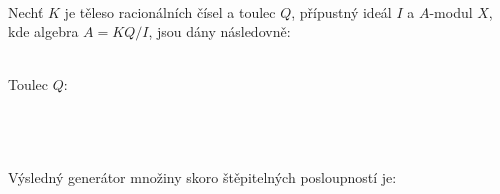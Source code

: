         \paragraph{ } Nechť $K$ je těleso racionálních čísel a toulec $Q$, přípustný ideál $I$ a $A$-modul $X$, 
        kde algebra $A=KQ/I$, jsou dány následovně: \\\\
        \centerline{
          Toulec $Q$: 
         }\\\\\\
         Výsledný generátor množiny skoro štěpitelných posloupností je: 
         \\\\
